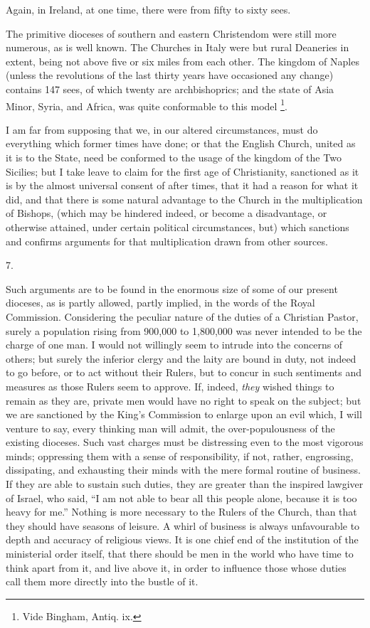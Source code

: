 Again, in Ireland, at one time, there were from
fifty to sixty sees.

The primitive dioceses of southern and eastern
Christendom were still more numerous, as is well known. The Churches
in Italy were but rural Deaneries in extent, being not above five
or six miles from each other. The kingdom of Naples (unless the
revolutions of the last thirty years have occasioned any change)
contains 147 sees, of which twenty are archbishoprics; and the state
of Asia Minor, Syria, and Africa, was quite conformable to this model
\footnote{Vide Bingham, Antiq. ix.}.

I am far from supposing that we, in our altered
circumstances, must do everything which former times have done; or
that the English Church, united as it is to the State, need be
conformed to the usage of the kingdom of the Two Sicilies; but I take
leave to claim for the first age of Christianity, sanctioned as it is
by the almost universal consent of after times, that it had a reason
for what it did, and that there is some natural advantage to the
Church in the multiplication of Bishops, (which may be hindered
indeed, or become a disadvantage, or otherwise attained, under certain
political circumstances, but) which sanctions and confirms arguments
for that multiplication drawn from other sources.

7.

Such arguments are to be found in the enormous
size of some of our present dioceses, as is partly allowed, partly
implied, in the words of the Royal Commission. Considering the
peculiar nature of the duties of a Christian Pastor, surely a
population rising from 900,000 to 1,800,000 was never intended to be
the charge of one man. I would not willingly seem to intrude into the
concerns of others; but surely the inferior clergy and the laity are
bound in duty, not indeed to go before, or to act without their
Rulers, but to concur in such sentiments and measures as those Rulers
seem to approve. If, indeed, \emph{they} wished things to remain as
they are, private men would have no right to speak on the subject; but
we are sanctioned by the King's Commission to enlarge upon an
evil which, I will venture to say, every thinking man will admit, the
over-populousness of the existing dioceses. Such vast charges must be
distressing even to the most vigorous minds; oppressing them with a
sense of responsibility, if not, rather, engrossing, dissipating, and
exhausting their minds with the mere formal routine of business. If
they are able to sustain such duties, they are greater than the
inspired lawgiver of Israel, who said, ``I am not able to bear all this
people alone, because it is too heavy for me.'' Nothing is more
necessary to the Rulers of the Church, than that they should have
seasons of leisure. A whirl of business is always unfavourable to
depth and accuracy of religious views. It is one chief end of the
institution of the ministerial order itself, that there should be men
in the world who have time to think apart from it, and live above it,
in order to influence those whose duties call them more directly into
the bustle of it.

